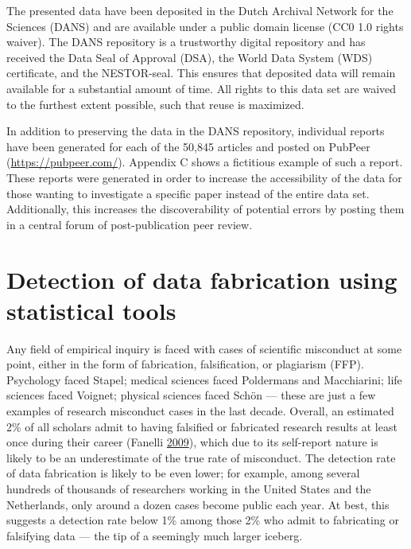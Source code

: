 \documentclass[a5paper]{book}
\begin{document}
The presented data have been deposited in the Dutch Archival Network for
the Sciences (DANS) and are available under a public domain license (CC0
1.0 rights waiver). The DANS repository is a trustworthy digital
repository and has received the Data Seal of Approval (DSA), the World
Data System (WDS) certificate, and the NESTOR-seal. This ensures that
deposited data will remain available for a substantial amount of time.
All rights to this data set are waived to the furthest extent possible,
such that reuse is maximized.

In addition to preserving the data in the DANS repository, individual
reports have been generated for each of the 50,845 articles and posted
on PubPeer (\url{https://pubpeer.com/}). Appendix C shows a fictitious
example of such a report. These reports were generated in order to
increase the accessibility of the data for those wanting to investigate
a specific paper instead of the entire data set. Additionally, this
increases the discoverability of potential errors by posting them in a
central forum of post-publication peer review.

\chapter{Detection of data fabrication using statistical
tools}\label{detection-of-data-fabrication-using-statistical-tools}

Any field of empirical inquiry is faced with cases of scientific
misconduct at some point, either in the form of fabrication,
falsification, or plagiarism (FFP). Psychology faced Stapel; medical
sciences faced Poldermans and Macchiarini; life sciences faced Voignet;
physical sciences faced Schön --- these are just a few examples of
research misconduct cases in the last decade. Overall, an estimated 2\%
of all scholars admit to having falsified or fabricated research results
at least once during their career (Fanelli
\protect\hyperlink{ref-doi:10.1371ux2fjournal.pone.0005738}{2009}),
which due to its self-report nature is likely to be an underestimate of
the true rate of misconduct. The detection rate of data fabrication is
likely to be even lower; for example, among several hundreds of
thousands of researchers working in the United States and the
Netherlands, only around a dozen cases become public each year. At best,
this suggests a detection rate below 1\% among those 2\% who admit to
fabricating or falsifying data --- the tip of a seemingly much larger
iceberg.
\end{document}
